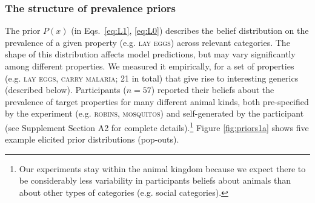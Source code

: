 \documentclass[10pt,letterpaper]{article}
\begin{document}

\subsubsection*{The structure of prevalence priors} 

 The prior $P(x)$ (in Eqs.~\ref{eq:L1}, \ref{eq:L0}) describes the belief distribution on the prevalence of a given property (e.g. \textsc{lay eggs}) across relevant categories. 
The shape of this distribution affects model predictions, but may vary significantly among different properties.
 We measured it empirically, for a set of properties (e.g. \textsc{lay eggs, carry malaria}; 21 in total) that give rise to interesting generics (described below). Participants ($n=57$) reported their beliefs about the prevalence of target properties  for many different animal kinds, both pre-specified by the experiment (e.g. \textsc{robins, mosquitos}) and self-generated by the participant (see Supplement Section A2 for complete details).\footnote{Our experiments stay within the animal kingdom because we expect there to be considerably less variability in participants beliefs about animals than about other types of categories (e.g. social categories).} Figure \ref{fig:priors1a} shows five example elicited prior distributions (pop-outs).
\end{document}
